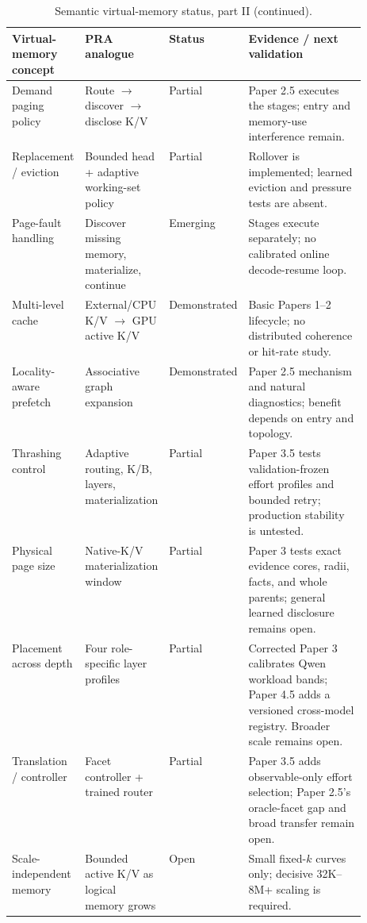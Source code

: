 \documentclass[11pt]{article}
\begin{document}
\begin{table}[p]
\centering
\scriptsize
\caption{Semantic virtual-memory status, part II (continued).}
\label{tab:vm-status-b}
\begin{tabularx}{\textwidth}{@{}p{0.18\linewidth}p{0.21\linewidth}p{0.13\linewidth}X@{}}
\toprule
Virtual-memory concept & PRA analogue & Status & Evidence / next validation \\
\midrule
Demand paging policy & Route $\rightarrow$ discover $\rightarrow$ disclose K/V & Partial & Paper 2.5 executes the stages; entry and memory-use interference remain. \\
Replacement / eviction & Bounded head + adaptive working-set policy & Partial & Rollover is implemented; learned eviction and pressure tests are absent. \\
Page-fault handling & Discover missing memory, materialize, continue & Emerging & Stages execute separately; no calibrated online decode-resume loop. \\
Multi-level cache & External/CPU K/V $\rightarrow$ GPU active K/V & Demonstrated & Basic Papers 1--2 lifecycle; no distributed coherence or hit-rate study. \\
Locality-aware prefetch & Associative graph expansion & Demonstrated & Paper 2.5 mechanism and natural diagnostics; benefit depends on entry and topology. \\
Thrashing control & Adaptive routing, K/B, layers, materialization & Partial & Paper 3.5 tests validation-frozen effort profiles and bounded retry; production stability is untested. \\
Physical page size & Native-K/V materialization window & Partial & Paper 3 tests exact evidence cores, radii, facts, and whole parents; general learned disclosure remains open. \\
Placement across depth & Four role-specific layer profiles & Partial & Corrected Paper 3 calibrates Qwen workload bands; Paper 4.5 adds a versioned cross-model registry. Broader scale remains open. \\
Translation / controller & Facet controller + trained router & Partial & Paper 3.5 adds observable-only effort selection; Paper 2.5's oracle-facet gap and broad transfer remain open. \\
Scale-independent memory & Bounded active K/V as logical memory grows & Open & Small fixed-$k$ curves only; decisive 32K--8M+ scaling is required. \\
\bottomrule
\end{tabularx}
\end{table}
\end{document}
